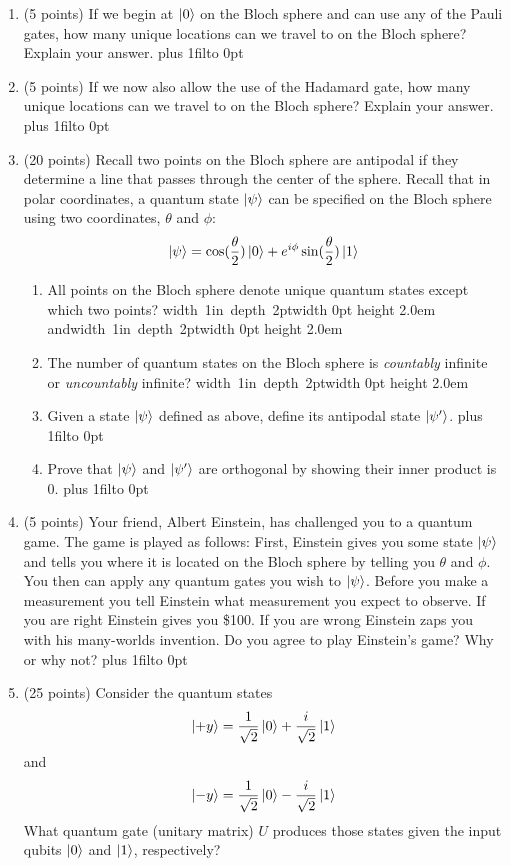 \documentclass[12pt]{article}
\newcommand{\Blank}{\mbox{\hskip 4pt\vrule width 1in depth 2pt}\vrule width 0pt height 2.0em}
\def\DefaultSpace{1in}
\newcommand{\LeaveSpace}[1][\DefaultSpace]{%
\vskip #1 plus 1fil\relax\hbox to 0pt{\hss} %
}
\begin{document}
\begin{enumerate}[font=\bfseries]
    \item (5 points) If we begin at $\ket{0}$ on the Bloch sphere and can use any of the Pauli gates, how many unique locations can we travel to on the Bloch sphere? Explain your answer. \LeaveSpace{}
    \item (5 points) If we now also allow the use of the Hadamard gate, how many unique locations can we travel to on the Bloch sphere? Explain your answer. \LeaveSpace{}
    \item (20 points) Recall two points on the Bloch sphere are antipodal if they determine a line that passes through the center of the sphere. Recall that in polar coordinates, a quantum state $\ket{\psi}$ can be specified on the Bloch sphere using two coordinates, $\theta$ and $\phi$:
    \[\ket{\psi} = \cos(\frac{\theta}{2})\ket{0}
    + e^{i\phi}\sin(\frac{\theta}{2})\ket{1}\]
    \begin{enumerate}
        \item All points on the Bloch sphere denote unique quantum states except which two points? \Blank{} and\Blank{}
        \item The number of quantum states on the Bloch sphere is \emph{countably} infinite or \emph{uncountably} infinite? \Blank{}
        \item Given a state $\ket{\psi}$ defined as above, define its antipodal state $\ket{\psi'}$. \LeaveSpace{}
        \item Prove that $\ket{\psi}$ and $\ket{\psi'}$ are orthogonal by showing their inner product is 0. \LeaveSpace[2.0in]
    \end{enumerate}
    \item (5 points) Your friend, Albert Einstein, has challenged you to a quantum game. The game is played as follows: First, Einstein gives you some state $\ket{\psi}$ and tells you where it is located on the Bloch sphere by telling you $\theta$ and $\phi$. You then can apply any quantum gates you wish to $\ket{\psi}$. Before you make a measurement you tell Einstein what measurement you expect to observe. If you are right Einstein gives you \$100. If you are wrong Einstein zaps you with his many-worlds invention. Do you agree to play Einstein's game? Why or why not? \LeaveSpace{}
    \item (25 points) Consider the quantum states
        \[\ket{+y} = \frac{1}{\sqrt{2}}\ket{0} + \frac{i}{\sqrt{2}}\ket{1}\]
        and
        \[\ket{-y} = \frac{1}{\sqrt{2}}\ket{0} - \frac{i}{\sqrt{2}}\ket{1}\]
        What quantum gate (unitary matrix) $U$ produces those states given the input qubits $\ket{0}$ and $\ket{1}$, respectively?

\end{enumerate}
\end{document}
